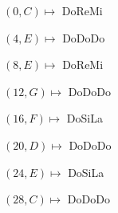 \documentclass[preview]{standalone}
\begin{document}
\begin{center}
$(0,C) \mapsto$ DoReMi

$(4,E) \mapsto$ DoDoDo

$(8,E) \mapsto$ DoReMi

$(12,G) \mapsto$ DoDoDo

$(16,F) \mapsto$ DoSiLa

$(20,D) \mapsto$ DoDoDo

$(24,E) \mapsto$ DoSiLa

$(28,C) \mapsto$ DoDoDo
\end{center}
\end{document}
